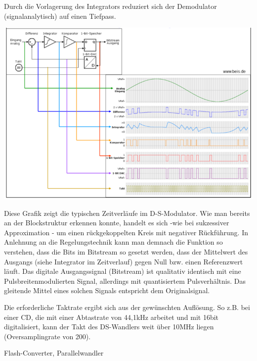 \documentclass[a4paper]{article}
\begin{document}
\begin{multicols}{3}
\begin{itemize*}
    \item Durch die Vorlagerung des Integrators reduziert sich der Demodulator (signalanalytisch) auf einen Tiefpass.
    \item \includegraphics[width=.5\linewidth]{Assets/Biosignalverarbeitung-Delta-Sigma-Wandlung-4.png}
    \item Diese Grafik zeigt die typischen Zeitverläufe im D-S-Modulator. Wie man bereits an der Blockstruktur erkennen konnte, handelt es sich -wie bei sukzessiver Approximation - um einen rückgekoppelten Kreis mit negativer Rückführung. In Anlehnung an die Regelungstechnik kann man demnach die Funktion so verstehen, dass die Bits im Bitstream so gesetzt werden, dass der Mittelwert des Ausgangs (siehe Integrator im Zeitverlauf) gegen Null bzw. einen Referenzwert läuft. Das digitale Ausgangssignal (Bitstream) ist qualitativ identisch mit eine Pulsbreitenmodulierten Signal, allerdings mit quantisiertem Pulsverhältnis. Das gleitende Mittel eines solchen Signals entspricht dem Originalsignal.
    \item Die erforderliche Taktrate ergibt sich aus der gewünschten Auflösung. So z.B. bei einer CD, die mit einer Abtastrate von 44,1kHz arbeitet und mit 16bit digitalisiert, kann der Takt des DS-Wandlers weit über 10MHz liegen (Oversamplingrate von 200).
  \end{itemize*}

  Flash-Converter, Parallelwandler


\end{multicols}
\end{document}
